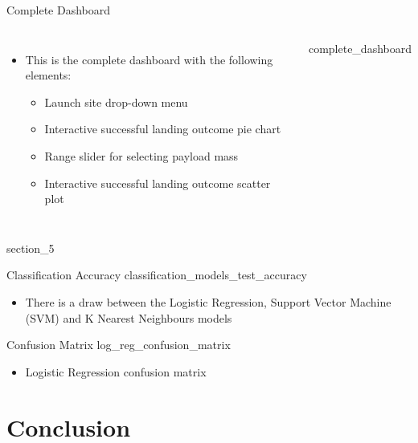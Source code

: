\begin{frame}{Complete Dashboard}
    \begin{columns}
            \begin{itemize}
                \item This is the complete dashboard with the following elements:
                \begin{itemize}
                    \item Launch site drop-down menu
                    \item Interactive successful landing outcome pie chart
                    \item Range slider for selecting payload mass
                    \item Interactive successful landing outcome scatter plot
                \end{itemize}
            \end{itemize}
            {complete_dashboard}
    \end{columns}
\end{frame}

{
{section_5}
\begin{frame}[plain]
\end{frame}
}

\begin{frame}{Classification Accuracy}
    {classification_models_test_accuracy}
    \begin{itemize}
        \item There is a draw between the Logistic Regression, Support Vector Machine (SVM) and K Nearest Neighbours models
    \end{itemize}
\end{frame}

\begin{frame}{Confusion Matrix}
    {log_reg_confusion_matrix}
    \begin{itemize}
        \item Logistic Regression confusion matrix
    \end{itemize}
\end{frame}

\section{Conclusion}

